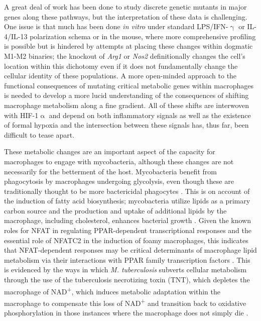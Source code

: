 A great deal of work has been done to study discrete genetic mutants in major genes along these pathways, but the interpretation of these data is challenging. One issue is that much has been done \textit{in vitro} under standard LPS/IFN\hyp{}$\upgamma$ or IL\hyp{}4/IL\hyp{}13 polarization schema or in the mouse, where more comprehensive profiling is possible but is hindered by attempts at placing these changes within dogmatic M1\hyp{}M2 binaries; the knockout of \textit{Arg1} or \textit{Nos2} definitionally changes the cell's location within this dichotomy even if it does not fundamentally change the cellular identity of these populations. A more open\hyp{}minded approach to the functional consequences of mutating critical metabolic genes within macrophages is needed to develop a more lucid understanding of the consequences of shifting macrophage metabolism along a fine gradient. All of these shifts are interwoven with HIF\hyp{}1$\upalpha$ and depend on both inflammatory signals as well as the existence of formal hypoxia and the intersection between these signals has, thus far, been difficult to tease apart.

These metabolic changes are an important aspect of the capacity for macrophages to engage with mycobacteria, although these changes are not necessarily for the betterment of the host. Mycobacteria benefit from phagocytosis by macrophages undergoing glycolysis, even though these are traditionally thought to be more bactericidal phagocytes \citep{Mehrotra2014, Escoll2019, Shi2019}. This is on account of the induction of fatty acid biosynthesis; mycobacteria utilize lipids as a primary carbon source and the production and uptake of additional lipids by the macrophage, including cholesterol, enhances bacterial growth \citep{Gatfield2000, Nazarova2019, Yan2020}. Given the known roles for NFAT in regulating PPAR\hyp{}dependent transcriptional responses and the essential role of NFATC2 in the induction of foamy macrophages, this indicates that NFAT\hyp{}dependent responses may be critical determinants of macrophage lipid metabolism via their interactions with PPAR family transcription factors \citep{Du2020, Du2021, Laval2021}. This is evidenced by the ways in which \textit{M. tuberculosis} subverts cellular metabolism through the use of the tuberculosis necrotizing toxin (TNT), which depletes the macrophage of NAD\textsuperscript{+}, which induces metabolic adaptation within the macrophage to compensate this loss of NAD\textsuperscript{+} and transition back to oxidative phosphorylation in those instances where the macrophage does not simply die \citep{Howard2020}. 

